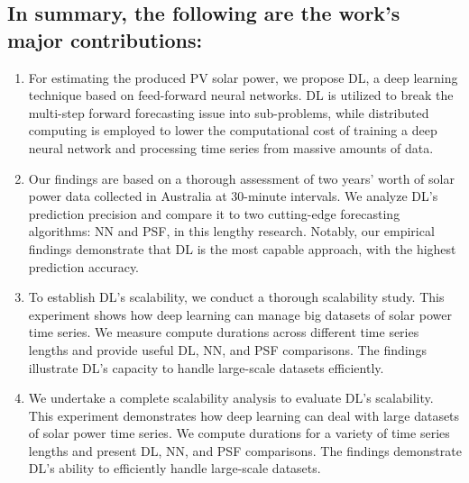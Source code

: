 \documentclass[a4paper,fleqn]{cas-sc}
\begin{document}
\subsection{In summary, the following are the work's major contributions:}
\begin{enumerate}
  \item For estimating the produced PV solar power, we propose DL, a deep learning technique based on feed-forward neural networks. DL is utilized to break the multi-step forward forecasting issue into sub-problems, while distributed computing is employed to lower the computational cost of training a deep neural network and processing time series from massive amounts of data.
  \item Our findings are based on a thorough assessment of two years' worth of solar power data collected in Australia at 30-minute intervals. We analyze DL's prediction precision and compare it to two cutting-edge forecasting algorithms: NN and PSF, in this lengthy research. Notably, our empirical findings demonstrate that DL is the most capable approach, with the highest prediction accuracy.
  \item To establish DL's scalability, we conduct a thorough scalability study. This experiment shows how deep learning can manage big datasets of solar power time series. We measure compute durations across different time series lengths and provide useful DL, NN, and PSF comparisons. The findings illustrate DL's capacity to handle large-scale datasets efficiently.
  \item We undertake a complete scalability analysis to evaluate DL's scalability. This experiment demonstrates how deep learning can deal with large datasets of solar power time series. We compute durations for a variety of time series lengths and present DL, NN, and PSF comparisons. The findings demonstrate DL's ability to efficiently handle large-scale datasets.
\end{enumerate}
\end{document}
